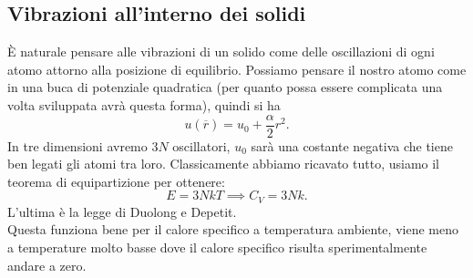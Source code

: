 \subsection{Vibrazioni all'interno dei solidi}%
È naturale pensare alle vibrazioni di un solido come delle oscillazioni di ogni atomo attorno alla posizione di equilibrio. Possiamo pensare il nostro atomo come in una buca di potenziale quadratica (per quanto possa essere complicata una volta sviluppata avrà questa forma), quindi si ha 
\[
	u( \overline{r}) = u_0+ \frac{\alpha }{2}r^2
.\] 
In tre dimensioni avremo $3N$ oscillatori, $u_0$ sarà una costante negativa che tiene ben legati gli atomi tra loro. Classicamente abbiamo ricavato tutto, usiamo il teorema di equipartizione per ottenere:
\[
	E = 3N kT \implies C_{V} = 3Nk
.\] 
L'ultima è la legge di Duolong e Depetit.\\
Questa funziona bene per il calore specifico a temperatura ambiente, viene meno a temperature molto basse dove il calore specifico risulta sperimentalmente andare a zero.
